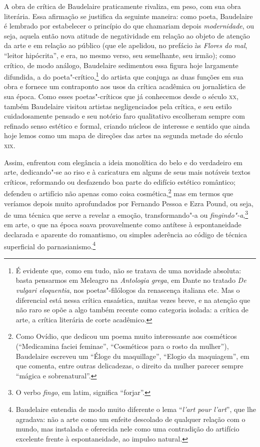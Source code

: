 A obra de crítica de Baudelaire praticamente rivaliza, em peso, com sua
obra literária. Essa afirmação se justifica da seguinte maneira: como
poeta, Baudelaire é lembrado por estabelecer o princípio do que
chamariam depois \textit{modernidade}, ou seja, aquela então nova
atitude de negatividade em relação ao objeto de atenção da arte e em
relação ao público (que ele apelidou, no prefácio às \textit{Flores do
mal}, “leitor hipócrita”, e era, no mesmo verso, seu semelhante, seu
irmão); como crítico, de modo análogo, Baudelaire sedimentou essa
figura hoje largamente difundida, a do poeta"-crítico,\footnote{ É
evidente que, como em tudo, não se tratava de uma novidade absoluta:
basta pensarmos em Meleagro na \textit{Antologia grega}, em Dante no		
tratado \textit{De vulgari eloquentia}, nos poetas"-filólogos da
renascença italiana etc. Mas o diferencial está nessa crítica
ensaística, muitas vezes breve, e na atenção que não raro se opõe a
algo também recente como categoria isolada: a crítica de arte, a
crítica literária de corte acadêmico.} do artista que conjuga as duas
funções em sua obra e fornece um contraponto aos usos da crítica
acadêmica ou jornalística de sua época. Como esses poetas"-críticos que
já conhecemos desde o século \textsc{xx}, também Baudelaire visitou artistas
negligenciados pela crítica, e seu estilo cuidadosamente pensado e seu 
notório faro qualitativo escolheram sempre com refinado senso estético
e formal, criando núcleos de interesse e sentido que ainda hoje lemos
como um mapa de direções das artes na segunda metade do século \textsc{xix}.

Assim, enfrentou com elegância a ideia monolítica do belo e do
verdadeiro em arte, dedicando"-se ao riso e à caricatura em alguns de
seus mais notáveis textos críticos, reformando ou desfazendo boa parte
do edifício estético romântico; defendeu o artifício não apenas como
coisa cosmética,\footnote{ Como Ovídio, que dedicou um poema muito	
interessante aos cosméticos (``Medicamina faciei feminae'',
“Cosméticos para o rosto da mulher”), Baudelaire escreveu um
``Éloge du maquillage'', “Elogio da maquiagem”, em que comenta,
entre outras delicadezas, o direito da mulher parecer sempre “mágica e
sobrenatural”.} mas em termos que veríamos depois muito aprofundados
por Fernando Pessoa e Ezra Pound, ou seja, de uma técnica que serve a  
revelar a emoção, transformando"-a ou \textit{fingindo"-a},\footnote{ O
verbo \textit{fingo}, em latim, significa “forjar”.} em arte, o que
na época soava provavelmente como antítese à espontaneidade declarada e
aparente do romantismo, ou simples aderência ao código de técnica
superficial do parnasianismo.\footnote{ Baudelaire entendia de modo
muito diferente o lema “\textit{l’art pour l’art}”, que lhe agradava: não a arte
como um enfeite descolado de qualquer relação com o mundo, mas
instalada e oferecida nele como uma contradição do artifício excelente
frente à espontaneidade, ao impulso natural.} 

